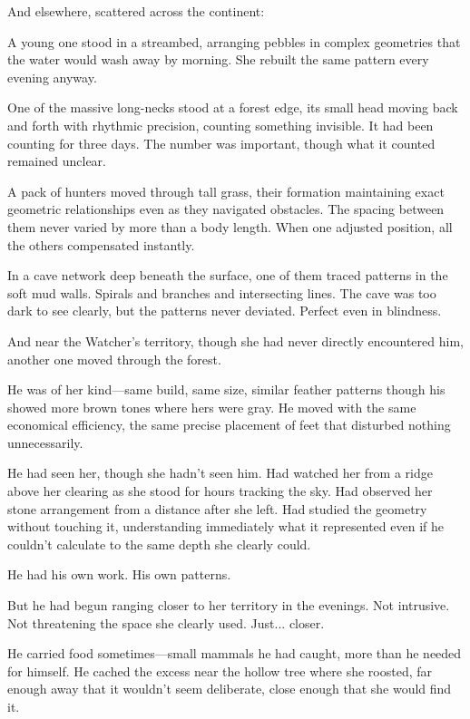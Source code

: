\scenebreak

And elsewhere, scattered across the continent:

A young one stood in a streambed, arranging pebbles in complex geometries that the water would wash away by morning. She rebuilt the same pattern every evening anyway.

One of the massive long-necks stood at a forest edge, its small head moving back and forth with rhythmic precision, counting something invisible. It had been counting for three days. The number was important, though what it counted remained unclear.

A pack of hunters moved through tall grass, their formation maintaining exact geometric relationships even as they navigated obstacles. The spacing between them never varied by more than a body length. When one adjusted position, all the others compensated instantly.

In a cave network deep beneath the surface, one of them traced patterns in the soft mud walls. Spirals and branches and intersecting lines. The cave was too dark to see clearly, but the patterns never deviated. Perfect even in blindness.

\scenebreak

And near the Watcher's territory, though she had never directly encountered him, another one moved through the forest.

He was of her kind—same build, same size, similar feather patterns though his showed more brown tones where hers were gray. He moved with the same economical efficiency, the same precise placement of feet that disturbed nothing unnecessarily.

He had seen her, though she hadn't seen him. Had watched her from a ridge above her clearing as she stood for hours tracking the sky. Had observed her stone arrangement from a distance after she left. Had studied the geometry without touching it, understanding immediately what it represented even if he couldn't calculate to the same depth she clearly could.

He had his own work. His own patterns.

But he had begun ranging closer to her territory in the evenings. Not intrusive. Not threatening the space she clearly used. Just... closer.

He carried food sometimes—small mammals he had caught, more than he needed for himself. He cached the excess near the hollow tree where she roosted, far enough away that it wouldn't seem deliberate, close enough that she would find it.

